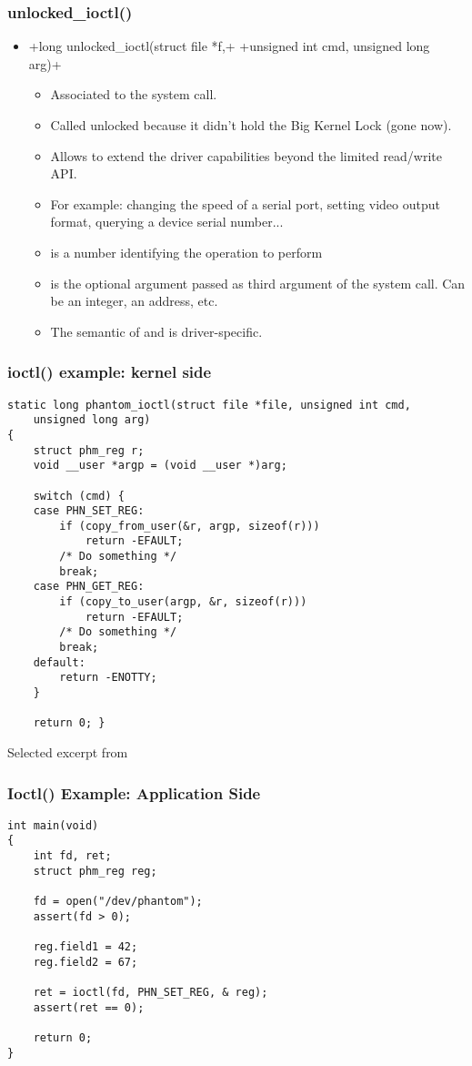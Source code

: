 \begin{frame}[fragile]
  \frametitle{unlocked\_ioctl()}
  \begin{itemize}
  \item {}+long unlocked_ioctl(struct file *f,+
    +unsigned int cmd, unsigned long arg)+
    \begin{itemize}
    \item Associated to the  system call.
    \item Called unlocked because it didn't hold the Big Kernel Lock
      (gone now).
    \item Allows to extend the driver capabilities beyond the limited
      read/write API.
    \item For example: changing the speed of a serial port, setting
      video output format, querying a device serial number...
    \item {} is a number identifying the operation to perform
    \item {} is the optional argument passed as third argument
      of the  system call. Can be an integer, an
      address, etc.
    \item The semantic of  and  is
      driver-specific.
    \end{itemize}
  \end{itemize}
\end{frame}

\begin{frame}[fragile]
  \frametitle{ioctl() example: kernel side}
\begin{verbatim}
static long phantom_ioctl(struct file *file, unsigned int cmd,
    unsigned long arg)
{
    struct phm_reg r;
    void __user *argp = (void __user *)arg;

    switch (cmd) {
    case PHN_SET_REG:
        if (copy_from_user(&r, argp, sizeof(r)))
            return -EFAULT;
        /* Do something */
        break;
    case PHN_GET_REG:
        if (copy_to_user(argp, &r, sizeof(r)))
            return -EFAULT;
        /* Do something */
        break;
    default:
        return -ENOTTY;
    }

    return 0; }
\end{verbatim}
Selected excerpt from 
\end{frame}

\begin{frame}[fragile]
  \frametitle{Ioctl() Example: Application Side}
\begin{verbatim}
int main(void)
{
    int fd, ret;
    struct phm_reg reg;

    fd = open("/dev/phantom");
    assert(fd > 0);

    reg.field1 = 42;
    reg.field2 = 67;

    ret = ioctl(fd, PHN_SET_REG, & reg);
    assert(ret == 0);

    return 0;
}
\end{verbatim}
\end{frame}

